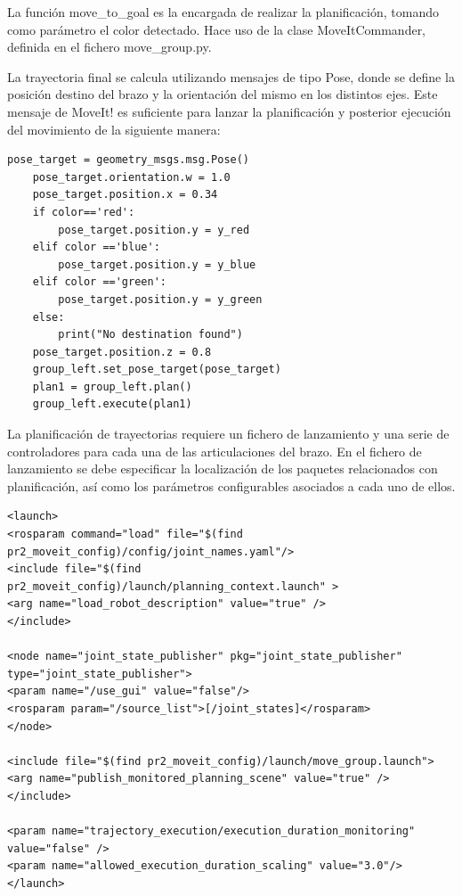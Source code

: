 \documentclass[12pt,spanish,chapterprefix, numbers=noenddot]{book}
\numberwithin{equation}{section}
\numberwithin{figure}{section}
\begin{document}
La función move\_to\_goal es la encargada de realizar la planificación, tomando como parámetro el color detectado.
Hace uso de la clase MoveItCommander, definida en el fichero move\_group.py.  
	
La trayectoria final se calcula utilizando mensajes de tipo Pose, donde se define la posición destino del brazo y la orientación del mismo en los distintos ejes. Este mensaje de MoveIt! es suficiente para lanzar la planificación y posterior ejecución del movimiento de la siguiente manera: 
\vspace{20pt}
	\begin{lstlisting}[frame=single] 
    pose_target = geometry_msgs.msg.Pose()
    pose_target.orientation.w = 1.0
    pose_target.position.x = 0.34 
    if color=='red':
        pose_target.position.y = y_red
    elif color =='blue':
        pose_target.position.y = y_blue
    elif color =='green':
        pose_target.position.y = y_green
    else:
        print("No destination found")
    pose_target.position.z = 0.8 
    group_left.set_pose_target(pose_target)
    plan1 = group_left.plan()
    group_left.execute(plan1)
	\end{lstlisting}

La planificación de trayectorias requiere un fichero de lanzamiento y una serie de controladores para cada una de las articulaciones del brazo. 
En el fichero de lanzamiento se debe especificar la localización de los paquetes relacionados con planificación, así como los parámetros configurables asociados a cada uno de ellos. 
\vspace{20pt}
	\begin{lstlisting}[frame=single] 
<launch>
<rosparam command="load" file="$(find pr2_moveit_config)/config/joint_names.yaml"/>
<include file="$(find pr2_moveit_config)/launch/planning_context.launch" >
<arg name="load_robot_description" value="true" />
</include>

<node name="joint_state_publisher" pkg="joint_state_publisher" type="joint_state_publisher">
<param name="/use_gui" value="false"/>
<rosparam param="/source_list">[/joint_states]</rosparam>
</node>

<include file="$(find pr2_moveit_config)/launch/move_group.launch">
<arg name="publish_monitored_planning_scene" value="true" />
</include>

<param name="trajectory_execution/execution_duration_monitoring" value="false" />
<param name="allowed_execution_duration_scaling" value="3.0"/>
</launch>
    \end{lstlisting}
\end{document}
